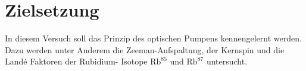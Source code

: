 \section{Zielsetzung}
\label{sec:Zielsetzung}

In diesem Versuch soll das Prinzip des optischen Pumpens kennengelernt werden. Dazu
werden unter Anderem die Zeeman-Aufspaltung, der Kernspin und die Landé Faktoren der Rubidium-
Isotope $\text{Rb}^{85}$ und $\text{Rb}^{87}$ untersucht.